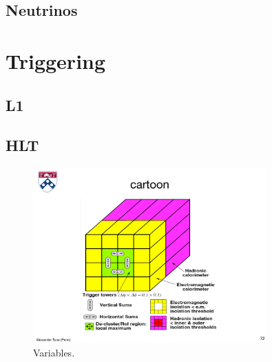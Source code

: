 \subsection{Neutrinos}
\section{Triggering}
\subsection{L1}
\subsection{HLT}

\begin{figure}[tp]
  \centering
  \includegraphics[width=0.80\textwidth]{figures/trigger/cartoonL1}
  \caption{Variables.}
  \label{fig:prospects-trigger-cartoonL1}
\end{figure}


